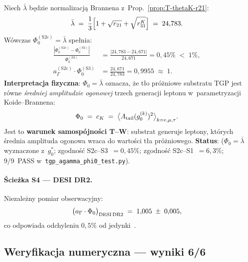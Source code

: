 \begin{proposition}%
\label{prop:W-S2c-Brannen}
Niech $\bar\lambda$ b\k{e}dzie normalizacj\k{a} Brannena
z~Prop.~\ref{prop:T-thetaK-r21}:
\begin{equation}
  \bar\lambda
  \;=\; \frac{1}{3}\Bigl[1 + \sqrt{r_{21}} + \sqrt{r_{31}^K}\Bigr]
  \;=\; 24{,}783.
\end{equation}
W\'owczas $\Phi_0^{(\mathrm{S2c})} = \bar\lambda$ spe\l{}nia:
\begin{align}
  \frac{|\Phi_0^{(\mathrm{S2c})} - \Phi_0^{(\mathrm{S3})}|}
       {\Phi_0^{(\mathrm{S3})}}
  &= \frac{|24{,}783 - 24{,}671|}{24{,}671}
   = 0{,}45\% \;<\; 1\%,
  \label{eq:W-S2c-S3-close}\\
  a_\Gamma^{(\mathrm{S2c})} \cdot \Phi_0^{(\mathrm{S3})}
  &= \frac{24{,}671}{24{,}783}
   = 0{,}9955 \;\approx\; 1.
\end{align}
\textbf{Interpretacja fizyczna}: $\Phi_0 = \bar\lambda$ oznacza,
\.ze t\l{}o pr\'o\.zniowe substratu TGP jest r\'owne
\textit{\'sredniej amplitudzie ogonowej} trzech generacji leptonu
w~parametryzacji Koide--Brannena:
\begin{equation}
  \Phi_0
  \;=\; c_K
  \;=\; \bigl\langle A_{\rm tail}(g_0^{(k)})^2 \bigr\rangle_{k=e,\mu,\tau}.
\end{equation}
Jest to \textbf{warunek samospójno\'{s}ci T--W}:
substrat generuje leptony, kt\'orych \'{s}rednia amplituda ogonowa
wraca do warto\'{s}ci t\l{}a pr\'o\.zniowego.
\textbf{Status}: 
($\Phi_0 = \bar\lambda$ wyznaczone z~$g_0^*$;
zgodno\'{s}\'{c} S2c--S3~$=0{,}45\%$;
zgodno\'{s}\'{c} S2c--S1~$=6{,}3\%$;
9/9~PASS w~\texttt{tgp\_agamma\_phi0\_test.py}).
\end{proposition}

\paragraph{\'{S}cie\.zka S4 — DESI DR2.}
Niezale\.zny pomiar obserwacyjny:
\begin{equation}\label{eq:W-DESI}
  \bigl(a_\Gamma \cdot \Phi_0\bigr)_{\rm DESI\,DR2}
  \;=\; 1{,}005 \;\pm\; 0{,}005,
\end{equation}
co odpowiada odchyleniu $0{,}5\%$ od jedynki~\cite{DESI2025}.

\subsection{Weryfikacja numeryczna — wyniki 6/6}%
\label{app:W-verification}


